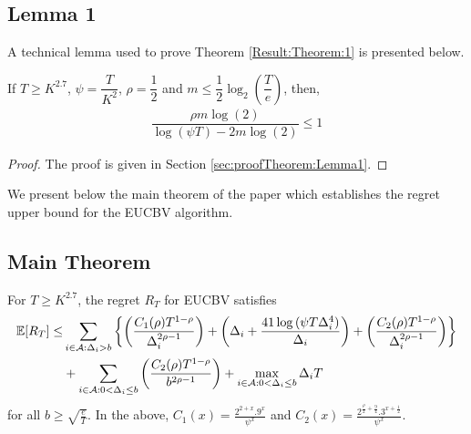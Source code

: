 \subsection{Lemma 1}

A technical lemma used to prove Theorem \ref{Result:Theorem:1} is presented below.

\begin{lemma}
\label{results:Lemma:1}
If $T\geq K^{2.7}$, $\psi=\dfrac{T}{ K^2}$, $\rho=\dfrac{1}{2}$ and $m\leq \dfrac{1}{2} \log_2(\dfrac{T}{e}) $, then,
\begin{align*}
\dfrac{\rho m \log(2)}{\log(\psi T) - 2m\log( 2)} \leq 1
\end{align*}
\end{lemma}

\begin{proof}
The proof is given in Section \ref{sec:proofTheorem:Lemma1}.
\end{proof}

We present below the main theorem of the paper which establishes the regret upper bound for the EUCBV  algorithm. 

\subsection{Main Theorem}
\begin{theorem}
\label{Result:Theorem:1}
For $T\geq K^{2.7}$, the regret $R_T$ for EUCBV satisfies
\begin{align*}
 \mathbb{E} [R_{T}] \leq &\sum\limits_{i\in \mathcal{A} :\Delta_{i} > b}\bigg\lbrace\bigg(\dfrac{C_{1}(\rho)T^{1-\rho}}{\Delta_{i}^{2\rho -1}}\bigg) + \bigg(\Delta_{i}+\dfrac{41\log{(\psi  T\Delta_{i}^{4})}}{\Delta_{i}}\bigg) + \bigg(\dfrac{ C_{2}(\rho) T^{1-\rho}}{\Delta_{i}^{2\rho-1}} \bigg)\bigg \rbrace \\ 
  & +\sum\limits_{i\in \mathcal{A} :0 < \Delta_{i}\leq b}\bigg(\dfrac{C_{2}(\rho)T^{1-\rho}}{b^{2\rho -1}} \bigg) + \max_{i\in \mathcal{A} :0 < \Delta_{i}\leq b}\Delta_{i}T
\end{align*}
for all $b\geq\sqrt{\frac{e}{T}}$. In the above, $C_1(x) = \frac{2^{2+x}.9^{x}}{\psi^{x}}$ and $C_2(x) = \frac{2^{\frac{\rho}{2}+\frac{9}{4}}.3^{x+\frac{1}{2}}}{\psi^{x}}$.
\end{theorem}

